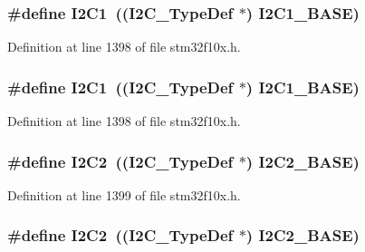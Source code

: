 \subsubsection[{\texorpdfstring{I2\+C1}{I2C1}}]{\setlength{\rightskip}{0pt plus 5cm}\#define I2\+C1~(({\bf I2\+C\+\_\+\+Type\+Def} $\ast$) {\bf I2\+C1\+\_\+\+B\+A\+SE})}\hypertarget{group___peripheral__declaration_gab45d257574da6fe1f091cc45b7eda6cc}{}\label{group___peripheral__declaration_gab45d257574da6fe1f091cc45b7eda6cc}


Definition at line 1398 of file stm32f10x.\+h.

\subsubsection[{\texorpdfstring{I2\+C1}{I2C1}}]{\setlength{\rightskip}{0pt plus 5cm}\#define I2\+C1~(({\bf I2\+C\+\_\+\+Type\+Def} $\ast$) {\bf I2\+C1\+\_\+\+B\+A\+SE})}\hypertarget{group___peripheral__declaration_gab45d257574da6fe1f091cc45b7eda6cc}{}\label{group___peripheral__declaration_gab45d257574da6fe1f091cc45b7eda6cc}


Definition at line 1398 of file stm32f10x.\+h.

\subsubsection[{\texorpdfstring{I2\+C2}{I2C2}}]{\setlength{\rightskip}{0pt plus 5cm}\#define I2\+C2~(({\bf I2\+C\+\_\+\+Type\+Def} $\ast$) {\bf I2\+C2\+\_\+\+B\+A\+SE})}\hypertarget{group___peripheral__declaration_gafa60ac20c1921ef1002083bb3e1f5d16}{}\label{group___peripheral__declaration_gafa60ac20c1921ef1002083bb3e1f5d16}


Definition at line 1399 of file stm32f10x.\+h.

\subsubsection[{\texorpdfstring{I2\+C2}{I2C2}}]{\setlength{\rightskip}{0pt plus 5cm}\#define I2\+C2~(({\bf I2\+C\+\_\+\+Type\+Def} $\ast$) {\bf I2\+C2\+\_\+\+B\+A\+SE})}\hypertarget{group___peripheral__declaration_gafa60ac20c1921ef1002083bb3e1f5d16}{}\label{group___peripheral__declaration_gafa60ac20c1921ef1002083bb3e1f5d16}


